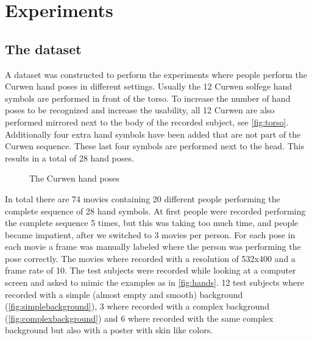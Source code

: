 
\chapter{Experiments}
\label{ch:experiments}


\section{The dataset}
A dataset was constructed to perform the experiments where people perform the Curwen hand poses in different settings. Usually the 12 Curwen solfege hand symbols are performed in front of the torso. To increase the number of hand poses to be recognized and increase the usability, all 12 Curwen are also performed mirrored next to the body of the recorded subject, see \autoref{fig:torso}. Additionally four extra hand symbols have been added that are not part of the Curwen sequence. These last four symbols are performed next to the head. This results in a total of 28 hand poses.

\begin{figure}[tb]
  \centering
\hspace{0.03\linewidth}
  \caption{The Curwen hand poses}
  \label{fig:torso}
\end{figure}


In total there are 74 movies containing 20 different people performing the complete sequence of 28 hand symbols. At first people were recorded performing the complete sequence 5 times, but this was taking too much time, and people became impatient, after we switched to 3 movies per person. For each pose in each movie a frame was manually labeled where the person was performing the pose correctly.  The movies where recorded with  a resolution of 532x400 and a frame rate of 10. The test subjects were recorded while looking at a computer screen and asked to mimic the examples as in \autoref{fig:hands}. 12 test subjects where recorded with a simple (almost empty and smooth) background (\autoref{fig:simplebackground}), 3 where recorded with a complex background (\autoref{fig:complexbackground}) and 6 where recorded with the same complex background but also with a poster with skin like colors.


